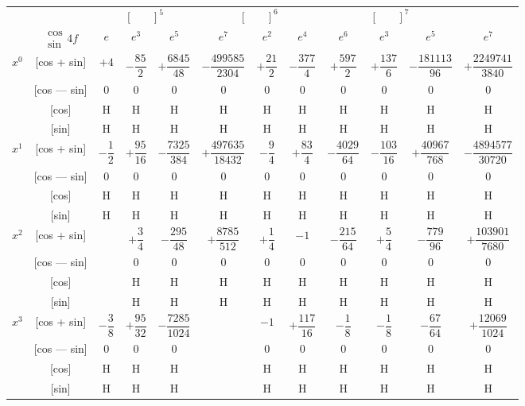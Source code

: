 \documentclass[11pt,a4paper]{book}
\begin{document}
\newpage
{}

\begin{center}
\small
\begin{tabular}{|c|c|c|c|c|c|c|c|c|c|c|c|}
\hline
& & \multicolumn{3}{c|}{$[\phantom{()}]^5$} & \multicolumn{3}{c|}{$[\phantom{()}]^6$} & \multicolumn{3}{c|}{$[\phantom{()}]^7$} \\
\cline{3-11}
& $\begin{smallmatrix} \cos \\ \sin \end{smallmatrix} 4f$ & $e$ & $e^3$ & $e^5$ & $e^7$ & $e^2$ & $e^4$ & $e^6$ & $e^3$ & $e^5$ & $e^7$ \\
\hline
\multirow{4}{*}{$x^0$} & [cos + sin] & $+4$ & $-\dfrac{85}{2}$ & $+\dfrac{6845}{48}$ & $-\dfrac{499585}{2304}$ & $+\dfrac{21}{2}$ & $-\dfrac{377}{4}$ & $+\dfrac{597}{2}$ & $+\dfrac{137}{6}$ & $-\dfrac{181113}{96}$ & $+\dfrac{2249741}{3840}$ \\
& [cos --- sin] & $0$ & $0$ & $0$ & $0$ & $0$ & $0$ & $0$ & $0$ & $0$ & $0$ \\
& [cos] & H & H & H & H & H & H & H & H & H & H \\
& [sin] & H & H & H & H & H & H & H & H & H & H \\
\hline
\multirow{4}{*}{$x^1$} & [cos + sin] & $-\dfrac{1}{2}$ & $+\dfrac{95}{16}$ & $-\dfrac{7325}{384}$ & $+\dfrac{497635}{18432}$ & $-\dfrac{9}{4}$ & $+\dfrac{83}{4}$ & $-\dfrac{4029}{64}$ & $-\dfrac{103}{16}$ & $+\dfrac{40967}{768}$ & $-\dfrac{4894577}{30720}$ \\
& [cos --- sin] & $0$ & $0$ & $0$ & $0$ & $0$ & $0$ & $0$ & $0$ & $0$ & $0$ \\
& [cos] & H & H & H & H & H & H & H & H & H & H \\
& [sin] & H & H & H & H & H & H & H & H & H & H \\
\hline
\multirow{4}{*}{$x^2$} & [cos + sin] & & $+\dfrac{3}{4}$ & $-\dfrac{295}{48}$ & $+\dfrac{8785}{512}$ & $+\dfrac{1}{4}$ & $-1$ & $-\dfrac{215}{64}$ & $+\dfrac{5}{4}$ & $-\dfrac{779}{96}$ & $+\dfrac{103901}{7680}$ \\
& [cos --- sin] & & $0$ & $0$ & $0$ & $0$ & $0$ & $0$ & $0$ & $0$ & $0$ \\
& [cos] & & H & H & H & H & H & H & H & H & H \\
& [sin] & & H & H & H & H & H & H & H & H & H \\
\hline
\multirow{4}{*}{$x^3$} & [cos + sin] & $-\dfrac{3}{8}$ & $+\dfrac{95}{32}$ & $-\dfrac{7285}{1024}$ & & $-1$ & $+\dfrac{117}{16}$ & $-\dfrac{1}{8}$ & $-\dfrac{1}{8}$ & $-\dfrac{67}{64}$ & $+\dfrac{12069}{1024}$ \\
& [cos --- sin] & $0$ & $0$ & $0$ & & $0$ & $0$ & $0$ & $0$ & $0$ & $0$ \\
& [cos] & H & H & H & & H & H & H & H & H & H \\
& [sin] & H & H & H & & H & H & H & H & H & H \\
\hline
\end{tabular}
\end{center}
\end{document}
